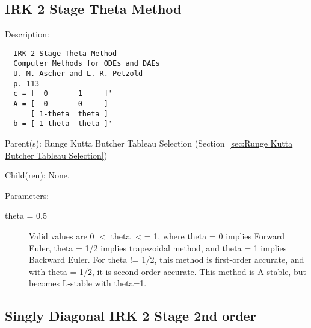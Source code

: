 \subsection{IRK 2 Stage Theta Method}
\label{sec:IRK 2 Stage Theta Method}

\begin{list}{}
  {\setlength{\leftmargin}{1.0in}
   \setlength{\labelwidth}{0.75in}
   \setlength{\labelsep}{0.125in}}
  \item[Description:]
\begin{verbatim}
  IRK 2 Stage Theta Method
  Computer Methods for ODEs and DAEs
  U. M. Ascher and L. R. Petzold
  p. 113
  c = [  0       1     ]'
  A = [  0       0     ]
      [ 1-theta  theta ]
  b = [ 1-theta  theta ]'
\end{verbatim}
  \item[Parent(s):]
    Runge Kutta Butcher Tableau Selection (Section~\ref{sec:Runge Kutta Butcher Tableau Selection})
  \item[Child(ren):]
    None. 
  \item[Parameters:]
    \begin{description}
      \item[theta = 0.5] 
Valid values are 0 $<$ theta $<$= 1, where theta = 0 implies Forward Euler, theta = 1/2 implies trapezoidal method, and theta = 1 implies Backward Euler. For theta != 1/2, this method is first-order accurate, and with theta = 1/2, it is second-order accurate.  This method is A-stable, but becomes L-stable with theta=1.
\end{description}

\end{list}

\subsection{Singly Diagonal IRK 2 Stage 2nd order}
\label{sec:Singly Diagonal IRK 2 Stage 2nd order}

